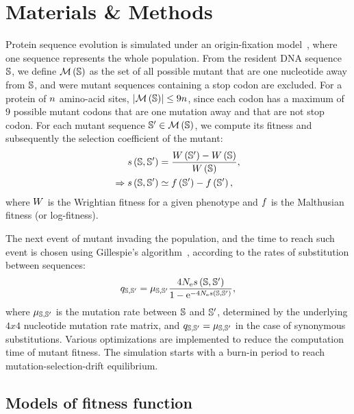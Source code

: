 \section{Materials \& Methods}
Protein sequence evolution is simulated under an origin-fixation model~\citep{McCandlish2014}, where one sequence represents the whole population.
From the resident \acrshort{DNA} sequence $\mathbb{S}$, we define $\mathcal{M}\left(\mathbb{S}\right)$ as the set of all possible mutant that are one nucleotide away from $\mathbb{S}$, and were mutant sequences containing a stop codon are excluded.
For a protein of $n$ amino-acid sites, $\left| \mathcal{M}\left(\mathbb{S}\right) \right| \leq 9 n$, since each codon has a maximum of $9$ possible mutant codons that are one mutation away and that are not stop codon.
For each mutant sequence $\mathbb{S}' \in \mathcal{M}\left(\mathbb{S}\right)$, we compute its fitness and subsequently the selection coefficient of the mutant:
\begin{align}
    s \left( \mathbb{S},\mathbb{S}'\right) & = \dfrac{ W \left(\mathbb{S}' \right) - W \left(\mathbb{S}\right) }{ W \left( \mathbb{S}\right)}, \\
    \Rightarrow s \left( \mathbb{S},\mathbb{S}'\right) & \simeq  f \left(\mathbb{S}' \right) -   f \left(\mathbb{S}' \right),
\end{align}
where $W$ is the Wrightian fitness for a given phenotype and $f $ is the Malthusian fitness (or log-fitness).

The next event of mutant invading the population, and the time to reach such event is chosen using Gillespie's algorithm~\citep{Gillespie1977}, according to the rates of substitution between sequences:
\begin{equation}
    q_{\mathbb{S}, \mathbb{S}'} = \mu_{\mathbb{S}, \mathbb{S}'} \dfrac{4 N_{\text{e}} s \left( \mathbb{S},\mathbb{S}'\right)}{1 - \text{e}^{-4 N_{\text{e}} s \left( \mathbb{S},\mathbb{S}'\right)}},
\end{equation}
where $\mu_{\mathbb{S}, \mathbb{S}'}$ is the mutation rate between $\mathbb{S}$ and $\mathbb{S}'$, determined by the underlying $4x4$ nucleotide mutation rate matrix, and ${q_{\mathbb{S}, \mathbb{S}'}} = \mu_{\mathbb{S}, \mathbb{S}'}$ in the case of synonymous substitutions.
Various optimizations are implemented to reduce the computation time of mutant fitness.
The simulation starts with a burn-in period to reach mutation-selection-drift equilibrium.

\subsection{Models of fitness function}
\label{MatMet:folding}

